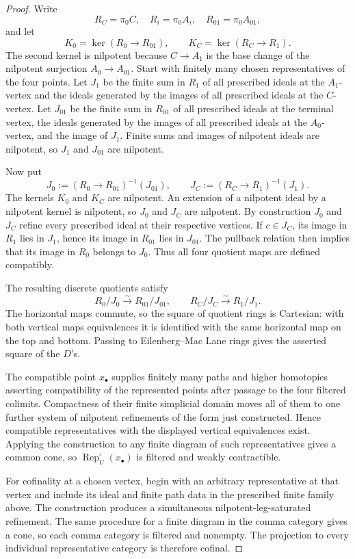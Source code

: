\begin{proof}
Write
\[
    R_C=\pi_0C,
    \quad R_i=\pi_0A_i,
    \quad R_{01}=\pi_0A_{01},
\]
and let
\[
    K_0=\ker(R_0\to R_{01}),
    \qquad
    K_C=\ker(R_C\to R_1).
\]
The second kernel is nilpotent because $C\to A_1$ is the base change of the
nilpotent surjection $A_0\to A_{01}$.  Start with finitely many chosen representatives of the four points.  Let
$J_1$ be the finite sum in $R_1$ of all prescribed ideals at the $A_1$-vertex
and the ideals generated by the images of all prescribed ideals at the
$C$-vertex.  Let $J_{01}$ be the finite sum in $R_{01}$ of all prescribed
ideals at the terminal vertex, the ideals generated by the images of all
prescribed ideals at the $A_0$-vertex, and the image of $J_1$.  Finite sums
and images of nilpotent ideals are nilpotent, so $J_1$ and $J_{01}$ are
nilpotent.

Now put
\[
    J_0:=(R_0\to R_{01})^{-1}(J_{01}),
    \qquad
    J_C:=(R_C\to R_1)^{-1}(J_1).
\]
The kernels $K_0$ and $K_C$ are nilpotent.  An extension of a nilpotent ideal
by a nilpotent kernel is nilpotent, so $J_0$ and $J_C$ are nilpotent.  By
construction $J_0$ and $J_C$ refine every prescribed ideal at their
respective vertices.  If $c\in J_C$, its image in $R_1$ lies in $J_1$, hence
its image in $R_{01}$ lies in $J_{01}$.  The pullback relation then implies
that its image in $R_0$ belongs to $J_0$.  Thus all four quotient maps are
defined compatibly.

The resulting discrete quotients satisfy
\[
    R_0/J_0\xrightarrow{\sim}R_{01}/J_{01},
    \qquad
    R_C/J_C\xrightarrow{\sim}R_1/J_1.
\]
The horizontal maps commute, so the square of quotient rings is Cartesian:
with both vertical maps equivalences it is identified with the same
horizontal map on the top and bottom.  Passing to Eilenberg--Mac Lane rings
gives the asserted square of the $D$'s.

The compatible point $x_\bullet$ supplies finitely many paths and higher
homotopies asserting compatibility of the represented points after passage
to the four filtered colimits.  Compactness of their finite simplicial domain
moves all of them to one further system of nilpotent refinements of the form
just constructed.  Hence compatible representatives with the displayed
vertical equivalences exist.  Applying the construction to any finite diagram
of such representatives gives a common cone, so
$\operatorname{Rep}^{\square}_U(x_\bullet)$ is filtered and weakly
contractible.

For cofinality at a chosen vertex, begin with an arbitrary representative at
that vertex and include its ideal and finite path data in the prescribed
finite family above.  The construction produces a simultaneous
nilpotent-leg-saturated refinement.  The same procedure for a finite diagram
in the comma category gives a cone, so each comma category is filtered and
nonempty.  The projection to every individual representative category is
therefore cofinal.
\end{proof}

